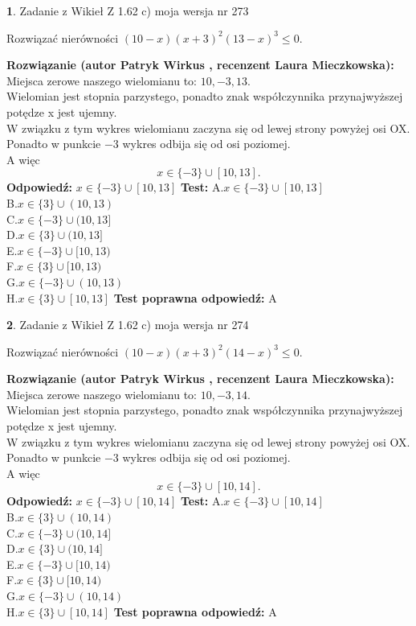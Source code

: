 \documentclass[12pt, a4paper]{article}
\theoremstyle{definition} %
\newtheorem{zad}{}
\newcommand{\zadStart}[1]{\begin{zad}#1\newline}
\newcommand{\zadStop}{\end{zad}}
\newcommand{\rozwStart}[2]{\noindent \textbf{Rozwiązanie (autor #1 , recenzent #2): }\newline}
\newcommand{\rozwStop}{\newline}
\newcommand{\odpStart}{\noindent \textbf{Odpowiedź:}\newline}
\newcommand{\odpStop}{\newline}
\newcommand{\testStart}{\noindent \textbf{Test:}\newline}
\newcommand{\testStop}{\newline}
\newcommand{\kluczStart}{\noindent \textbf{Test poprawna odpowiedź:}\newline}
\newcommand{\kluczStop}{\newline}
\begin{document}
\zadStart{Zadanie z Wikieł Z 1.62 c) moja wersja nr 273}

Rozwiązać nierówności $(10-x)(x+3)^{2}(13-x)^{3}\le0$.
\zadStop
\rozwStart{Patryk Wirkus}{Laura Mieczkowska}
Miejsca zerowe naszego wielomianu to: $10, -3, 13$.\\
Wielomian jest stopnia parzystego, ponadto znak współczynnika przy\linebreak najwyższej potędze x jest ujemny.\\ W związku z tym wykres wielomianu zaczyna się od lewej strony powyżej osi OX.\\
Ponadto w punkcie $-3$ wykres odbija się od osi poziomej.\\
A więc $$x \in \{-3\} \cup [10,13].$$
\rozwStop
\odpStart
$x \in \{-3\} \cup [10,13]$
\odpStop
\testStart
A.$x \in \{-3\} \cup [10,13]$\\
B.$x \in \{3\} \cup (10,13)$\\
C.$x \in \{-3\} \cup (10,13]$\\
D.$x \in \{3\} \cup (10,13]$\\
E.$x \in \{-3\} \cup [10,13)$\\
F.$x \in \{3\} \cup [10,13)$\\
G.$x \in \{-3\} \cup (10,13)$\\
H.$x \in \{3\} \cup [10,13]$
\testStop
\kluczStart
A
\kluczStop



\zadStart{Zadanie z Wikieł Z 1.62 c) moja wersja nr 274}

Rozwiązać nierówności $(10-x)(x+3)^{2}(14-x)^{3}\le0$.
\zadStop
\rozwStart{Patryk Wirkus}{Laura Mieczkowska}
Miejsca zerowe naszego wielomianu to: $10, -3, 14$.\\
Wielomian jest stopnia parzystego, ponadto znak współczynnika przy\linebreak najwyższej potędze x jest ujemny.\\ W związku z tym wykres wielomianu zaczyna się od lewej strony powyżej osi OX.\\
Ponadto w punkcie $-3$ wykres odbija się od osi poziomej.\\
A więc $$x \in \{-3\} \cup [10,14].$$
\rozwStop
\odpStart
$x \in \{-3\} \cup [10,14]$
\odpStop
\testStart
A.$x \in \{-3\} \cup [10,14]$\\
B.$x \in \{3\} \cup (10,14)$\\
C.$x \in \{-3\} \cup (10,14]$\\
D.$x \in \{3\} \cup (10,14]$\\
E.$x \in \{-3\} \cup [10,14)$\\
F.$x \in \{3\} \cup [10,14)$\\
G.$x \in \{-3\} \cup (10,14)$\\
H.$x \in \{3\} \cup [10,14]$
\testStop
\kluczStart
A
\kluczStop
\end{document}
